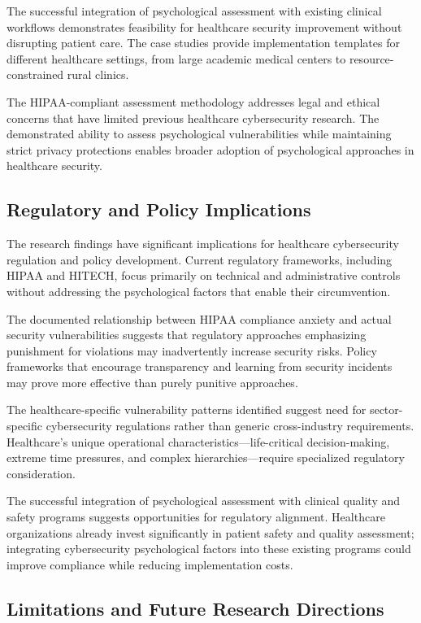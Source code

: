\documentclass[10pt, twocolumn]{article}
\begin{document}
The successful integration of psychological assessment with existing clinical workflows demonstrates feasibility for healthcare security improvement without disrupting patient care. The case studies provide implementation templates for different healthcare settings, from large academic medical centers to resource-constrained rural clinics.

The HIPAA-compliant assessment methodology addresses legal and ethical concerns that have limited previous healthcare cybersecurity research. The demonstrated ability to assess psychological vulnerabilities while maintaining strict privacy protections enables broader adoption of psychological approaches in healthcare security.

\subsection{Regulatory and Policy Implications}

The research findings have significant implications for healthcare cybersecurity regulation and policy development. Current regulatory frameworks, including HIPAA and HITECH, focus primarily on technical and administrative controls without addressing the psychological factors that enable their circumvention.

The documented relationship between HIPAA compliance anxiety and actual security vulnerabilities suggests that regulatory approaches emphasizing punishment for violations may inadvertently increase security risks. Policy frameworks that encourage transparency and learning from security incidents may prove more effective than purely punitive approaches.

The healthcare-specific vulnerability patterns identified suggest need for sector-specific cybersecurity regulations rather than generic cross-industry requirements. Healthcare's unique operational characteristics—life-critical decision-making, extreme time pressures, and complex hierarchies—require specialized regulatory consideration.

The successful integration of psychological assessment with clinical quality and safety programs suggests opportunities for regulatory alignment. Healthcare organizations already invest significantly in patient safety and quality assessment; integrating cybersecurity psychological factors into these existing programs could improve compliance while reducing implementation costs.

\subsection{Limitations and Future Research Directions}
\end{document}
